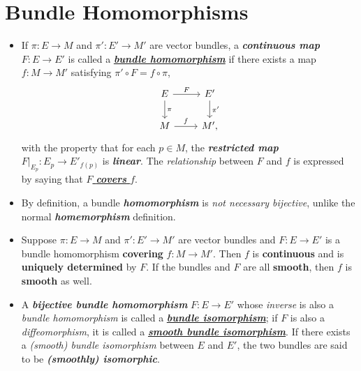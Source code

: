 \documentclass[11pt]{article}
\begin{document}
\section{Bundle Homomorphisms}
\begin{itemize}
\item \begin{definition}
If $\pi: E \rightarrow M$ and $\pi': E' \rightarrow M'$ are vector bundles, a \emph{\textbf{continuous map}} $F: E \rightarrow E'$ is called a \underline{\emph{\textbf{bundle homomorphism}}} if there exists a map $f: M \rightarrow M'$ satisfying $\pi' \circ F = f \circ \pi$,
\[
  \begin{tikzcd}
    E \arrow{r}{F} \arrow{d}{\pi} &  E' \arrow{d}{\pi'} \\
    M                \arrow{r}{f}                                &  M',
  \end{tikzcd}
\] with the property that for each $p \in M$, the \emph{\textbf{restricted map}} $F|_{E_{p}}: E_p \rightarrow E'_{f(p)}$ is \emph{\textbf{linear}}. The \emph{relationship} between $F$ and $f$ is expressed by saying that \underline{\emph{$F$ \textbf{covers} $f$}}.
\end{definition}

\item \begin{remark}
By definition, a bundle \emph{\textbf{homomorphism}} is \emph{not necessary bijective}, unlike the normal \emph{\textbf{homemorphism}} definition.
\end{remark}

\item \begin{proposition}
Suppose $\pi: E \rightarrow M$ and $\pi': E' \rightarrow M'$ are vector bundles and $F: E \rightarrow E'$ is a bundle homomorphism \textbf{covering} $f: M \rightarrow M'$. Then $f$ is \textbf{continuous} and is \textbf{uniquely determined} by $F$. If the bundles and $F$ are all \textbf{smooth}, then $f$ is \textbf{smooth} as well.
\end{proposition}

\item \begin{definition}
A \emph{\textbf{bijective bundle homomorphism}} $F: E \rightarrow E'$ whose \emph{inverse} is also a \emph{bundle homomorphism} is called a \underline{\emph{\textbf{bundle isomorphism}}}; if $F$ is also a \emph{diffeomorphism}, it is called a \underline{\emph{\textbf{smooth bundle isomorphism}}}. If there exists a \emph{(smooth) bundle isomorphism} between $E$ and $E'$, the two bundles are said to be \emph{\textbf{(smoothly) isomorphic}}.
\end{definition}


\end{itemize}
\end{document}
